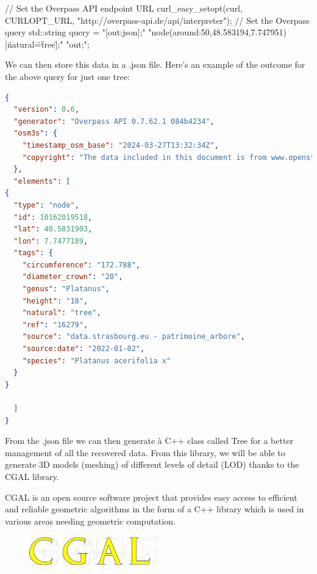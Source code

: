 \documentclass[12pt]{article}
\begin{document}
\vspace{0.5cm}
\begin{cpp}
// Set the Overpass API endpoint URL
curl_easy_setopt(curl, CURLOPT_URL, "http://overpass-api.de/api/interpreter");
// Set the Overpass query
std::string query = "[out:json];"
                    "node(around:50,48.583194,7.747951)[\"natural\"=\"tree\"];"
                    "out;";
\end{cpp}
\vspace{0.5cm}

We can then store this data in a .json file. Here's an example
of the outcome for the above query for just one tree:

\vspace{0.5cm}
\begin{lstlisting}[language=json]
{
  "version": 0.6,
  "generator": "Overpass API 0.7.62.1 084b4234",
  "osm3s": {
    "timestamp_osm_base": "2024-03-27T13:32:34Z",
    "copyright": "The data included in this document is from www.openstreetmap.org. The data is made available under ODbL."
  },
  "elements": [
{
  "type": "node",
  "id": 10162019518,
  "lat": 48.5831903,
  "lon": 7.7477189,
  "tags": {
    "circumference": "172.788",
    "diameter_crown": "20",
    "genus": "Platanus",
    "height": "18",
    "natural": "tree",
    "ref": "16279",
    "source": "data.strasbourg.eu - patrimoine_arbore",
    "source:date": "2022-01-02",
    "species": "Platanus acerifolia x"
  }
}

  ]
}
\end{lstlisting}
\vspace{0.5cm}

From the .json file we can then generate à C++ class called
Tree for a better management of all the recovered data.
From this library, we will be able to generate 3D models (meshing)
of different levels of detail (LOD) thanks to the CGAL library.


CGAL is an open source software project that provides easy access to efficient
and reliable geometric algorithms in the form of a C++ library which is used
in various areas needing geometric computation.\cite{cgal}

\begin{figure}[H]
    \vspace{1.5cm}
    \centering
    \includegraphics[width=0.5\textwidth]{images/cgal_logo.png}
\end{figure}
\end{document}
